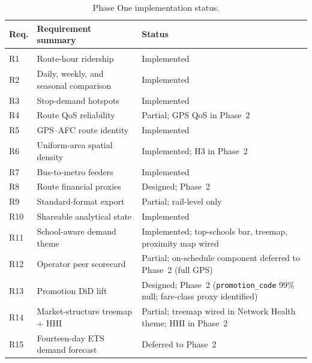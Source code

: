 \begin{table}[!htbp]
  \centering
  \caption{Phase One implementation status.}
  \label{tab:impl:eval}
  \footnotesize
  \renewcommand{\arraystretch}{1.05}
  \begin{tabularx}{\linewidth}{@{}>{\raggedright\arraybackslash}p{0.75cm}>{\raggedright\arraybackslash}X>{\raggedright\arraybackslash}p{4.15cm}@{}}
    \hline
    \textbf{Req.} & \textbf{Requirement summary} & \textbf{Status} \\
    \hline
    \multicolumn{3}{l}{\textit{Functional}} \\
    R1  & Route-hour ridership                                 & Implemented \\
    R2  & Daily, weekly, and seasonal comparison               & Implemented \\
    R3  & Stop-demand hotspots                                 & Implemented \\
    R4  & Route QoS reliability                                & Partial; GPS QoS in Phase~2 \\
    R5  & GPS--AFC route identity                              & Implemented \\
    R6  & Uniform-area spatial density                         & Implemented; H3 in Phase~2 \\
    R7  & Bus-to-metro feeders                                 & Implemented \\
    R8  & Route financial proxies                              & Designed; Phase~2 \\
    R9  & Standard-format export                               & Partial; rail-level only \\
    R10 & Shareable analytical state                           & Implemented \\
    R11 & School-aware demand theme                            & Implemented; top-schools bar, treemap, proximity map wired \\
    R12 & Operator peer scorecard                              & Partial; on-schedule component deferred to Phase~2 (full GPS) \\
    R13 & Promotion DiD lift                                   & Designed; Phase~2 (\texttt{promotion\_code} 99\% null; fare-class proxy identified) \\
    R14 & Market-structure treemap + HHI                       & Partial; treemap wired in Network Health theme; HHI in Phase~2 \\
    R15 & Fourteen-day ETS demand forecast                     & Deferred to Phase~2 \\

\end{tabularx}
\end{table}
